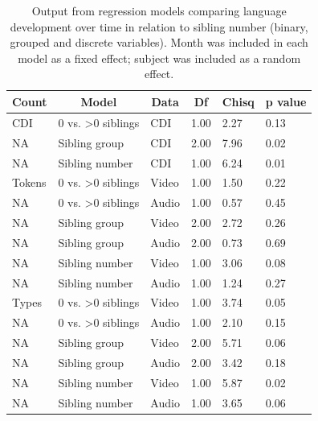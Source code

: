 \documentclass[
  english,
  man,floatsintext]{apa6}
\begin{document}
\begin{table}[H]

\begin{center}
\begin{threeparttable}

\caption{\label{tab:table-sibling-model-output}Output from regression models comparing language development over time in relation to sibling number (binary, grouped and discrete variables). Month was included in each model as a fixed effect; subject was included as a random effect.}

\small{

\begin{tabular}{llllll}
\toprule
Count & \multicolumn{1}{c}{Model} & \multicolumn{1}{c}{Data} & \multicolumn{1}{c}{Df} & \multicolumn{1}{c}{Chisq} & \multicolumn{1}{c}{p value}\\
\midrule
CDI & 0 vs. >0 siblings & CDI & 1.00 & 2.27 & 0.13\\
NA & Sibling group & CDI & 2.00 & 7.96 & 0.02\\
NA & Sibling number & CDI & 1.00 & 6.24 & 0.01\\
Tokens & 0 vs. >0 siblings & Video & 1.00 & 1.50 & 0.22\\
NA & 0 vs. >0 siblings & Audio & 1.00 & 0.57 & 0.45\\
NA & Sibling group & Video & 2.00 & 2.72 & 0.26\\
NA & Sibling group & Audio & 2.00 & 0.73 & 0.69\\
NA & Sibling number & Video & 1.00 & 3.06 & 0.08\\
NA & Sibling number & Audio & 1.00 & 1.24 & 0.27\\
Types & 0 vs. >0 siblings & Video & 1.00 & 3.74 & 0.05\\
NA & 0 vs. >0 siblings & Audio & 1.00 & 2.10 & 0.15\\
NA & Sibling group & Video & 2.00 & 5.71 & 0.06\\
NA & Sibling group & Audio & 2.00 & 3.42 & 0.18\\
NA & Sibling number & Video & 1.00 & 5.87 & 0.02\\
NA & Sibling number & Audio & 1.00 & 3.65 & 0.06\\
\bottomrule
\end{tabular}

}

\end{threeparttable}
\end{center}

\end{table}
\end{document}
